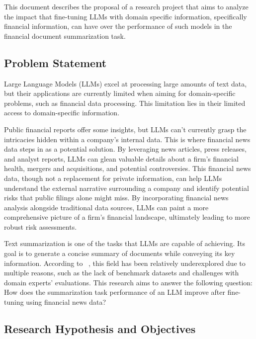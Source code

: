 This document describes the proposal of a research project that aims to analyze the impact that fine-tuning LLMs with
domain specific information, specifically financial information, can have over the performance of such models in the
financial document summarization task.

\subsection{Problem Statement}\label{subsec:problem-statement}

Large Language Models (LLMs) excel at processing large amounts of text data, but their applications are currently
limited when aiming for domain-specific problems, such as financial data processing.
This limitation lies in their limited access to domain-specific information.

Public financial reports offer some insights, but LLMs can't currently grasp the intricacies hidden within a company's
internal data.
This is where financial news data steps in as a potential solution.
By leveraging news articles, press releases, and analyst reports, LLMs can glean valuable details about a firm's
financial health, mergers and acquisitions, and potential controversies.
This financial news data, though not a replacement for private information, can help LLMs understand the external
narrative surrounding a company and identify potential risks that public filings alone might miss.
By incorporating financial news analysis alongside traditional data sources, LLMs can paint a more comprehensive
picture of a firm's financial landscape, ultimately leading to more robust risk assessments.

Text summarization is one of the tasks that LLMs are capable of achieving.
Its goal is to generate a concise summary of documents while conveying its key information.
According to ~\cite{Lee2024}, this field has been relatively underexplored due to multiple reasons, such as the lack of
benchmark datasets and challenges with domain experts' evaluations.
This research aims to answer the following question: How does the summarization task performance of an LLM improve
after fine-tuning using financial news data?

\subsection{Research Hypothesis and Objectives}\label{subsec:research-hypothesis-and-objectives}

